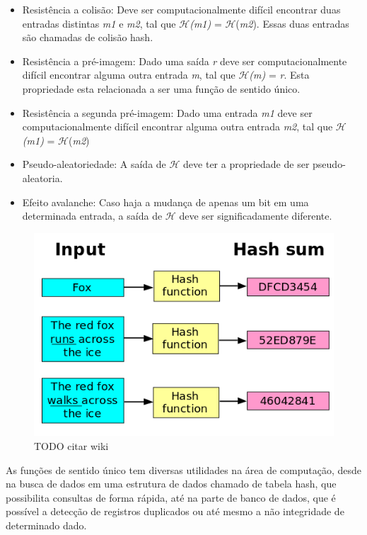 \documentclass{ufsctex/ufsctex}
\begin{document}
\begin{itemize}

	\item Resistência a colisão: Deve ser computacionalmente difícil encontrar
		duas entradas distintas \textit{m1} e \textit{m2}, tal que
		$\mathcal{H}$\textit{(m1)} = $\mathcal{H}$(\textit{m2}). Essas duas
		entradas são chamadas de colisão hash.
	\item Resistência a pré-imagem: Dado uma saída \textit{r} deve ser
		computacionalmente difícil encontrar alguma outra entrada \textit{m},
		tal que $\mathcal{H}$\textit{(m)} = \textit{r}. Esta propriedade esta
		relacionada a ser uma função de sentido único.
	\item Resistência a segunda pré-imagem: Dado uma entrada \textit{m1} deve
		ser computacionalmente difícil encontrar alguma outra entrada
		\textit{m2}, tal que $\mathcal{H}$\textit{(m1)} =
		$\mathcal{H}$(\textit{m2})
	\item Pseudo-aleatoriedade: A saída de $\mathcal{H}$ deve ter a propriedade
		de ser pseudo-aleatoria.
	\item Efeito avalanche: Caso haja a mudança de apenas um bit em uma
		determinada entrada, a saída de $\mathcal{H}$ deve ser significadamente
		diferente.

\end{itemize}

\begin{figure}[h]
	\centering
	\includegraphics[scale=0.35]{hash_function}
	\caption{TODO citar wiki}
	\label{fig:hash}
\end{figure}

As funções de sentido único tem diversas utilidades na área de computação,
desde na busca de dados em uma estrutura de dados chamado de tabela hash, que
possibilita consultas de forma rápida, até na parte de banco de dados, que é
possível a detecção de registros duplicados ou até mesmo a não integridade de
determinado dado.
\end{document}

